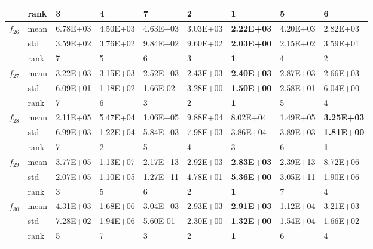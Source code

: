 \documentclass[a4paper,13pt,2p]{report}
\begin{document}
\begin{table}[!t]
{\begin{tabular}{|l|l|l|l|l|l|l|l|l|}
                     & rank & 3        & 4        & 7        & 2                 & \textbf{1}         & 5        & 6                 \\ \hline
\multirow{3}{*}{$f_{26}$} & mean & 6.78E+03 & 4.50E+03 & 4.63E+03 & 3.03E+03          & \textbf{2.22E+03}  & 4.20E+03 & 2.82E+03          \\ \cline{2-9} 
                     & std  & 3.59E+02 & 3.76E+02 & 9.84E+02 & 9.60E+02          & \textbf{2.03E+00}  & 2.15E+02 & 3.59E+01          \\ \cline{2-9} 
                     & rank & 7        & 5        & 6        & 3                 & \textbf{1}         & 4        & 2                 \\ \hline
\multirow{3}{*}{$f_{27}$} & mean & 3.22E+03 & 3.15E+03 & 2.52E+03 & 2.43E+03          & \textbf{2.40E+03}  & 2.87E+03 & 2.66E+03          \\ \cline{2-9} 
                     & std  & 6.09E+01 & 1.18E+02 & 1.66E-02 & 3.28E+00          & \textbf{1.50E+00}  & 2.58E+01 & 6.04E+00          \\ \cline{2-9} 
                     & rank & 7        & 6        & 3        & 2                 & \textbf{1}         & 5        & 4                 \\ \hline
\multirow{3}{*}{$f_{28}$} & mean & 2.11E+05 & 5.47E+04 & 1.06E+05 & 9.88E+04          & 8.02E+04           & 1.49E+05 & \textbf{3.25E+03} \\ \cline{2-9} 
                     & std  & 6.99E+03 & 1.22E+04 & 5.84E+03 & 7.98E+03          & 3.86E+04           & 3.89E+03 & \textbf{1.81E+00} \\ \cline{2-9} 
                     & rank & 7        & 2        & 5        & 4                 & 3                  & 6        & \textbf{1}        \\ \hline
\multirow{3}{*}{$f_{29}$} & mean & 3.77E+05 & 1.13E+07 & 2.17E+13 & 2.92E+03          & \textbf{2.83E+03}  & 2.39E+13 & 8.72E+06          \\ \cline{2-9} 
                     & std  & 2.07E+05 & 1.10E+05 & 1.27E+11 & 4.78E+01          & \textbf{5.36E+00}  & 3.05E+11 & 1.90E+06          \\ \cline{2-9} 
                     & rank & 3        & 5        & 6        & 2                 & \textbf{1}         & 7        & 4                 \\ \hline
\multirow{3}{*}{$f_{30}$} & mean & 4.31E+03 & 1.68E+06 & 3.04E+03 & 2.93E+03          & \textbf{2.91E+03}  & 1.12E+04 & 3.21E+03          \\ \cline{2-9} 
                     & std  & 7.28E+02 & 1.94E+06 & 5.60E-01 & 2.30E+00          & \textbf{1.32E+00}  & 1.54E+04 & 1.66E+02          \\ \cline{2-9} 
                     & rank & 5        & 7        & 3        & 2                 & \textbf{1}         & 6        & 4                 \\ \hline
\end{tabular}%
}
\end{table}
\end{document}
